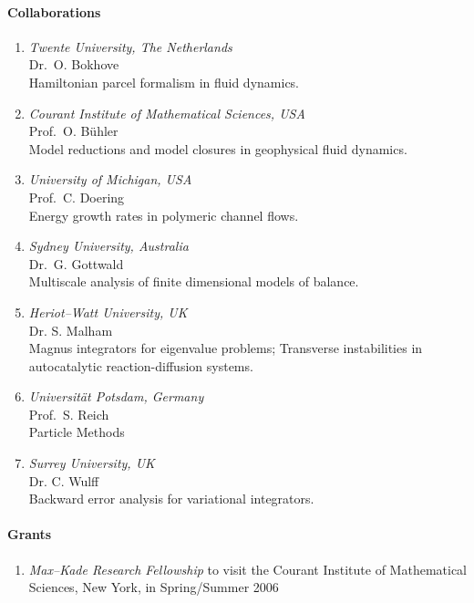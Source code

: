 \paragraph{Collaborations}
\begin{enumerate}
\item {\sl Twente University, The Netherlands} \\
Dr.\ O. Bokhove \\
Hamiltonian parcel formalism in fluid dynamics.
\item {\sl Courant Institute of Mathematical Sciences, USA} \\
Prof.\ O. B\"uhler \\
Model reductions and model closures in geophysical fluid
dynamics.
\item {\sl University of Michigan, USA} \\
Prof.\ C. Doering \\
Energy growth rates in polymeric channel flows.
\item {\sl Sydney University, Australia} \\
Dr.\ G. Gottwald \\
Multiscale analysis of finite dimensional models of balance.
\item {\sl Heriot--Watt University, UK}
\\ Dr. S. Malham \\
Magnus integrators for eigenvalue problems; Transverse instabilities
in autocatalytic reaction-diffusion systems.
\item {\sl Universit\"at Potsdam, Germany} \\
Prof.\ S. Reich \\
Particle Methods
\item {\sl Surrey University, UK} \\
Dr. C. Wulff \\
Backward error analysis for variational integrators.

\end{enumerate}

\paragraph{Grants}
\begin{enumerate}
\item {\sl Max--Kade Research Fellowship} to visit the Courant Institute of
Mathematical Sciences, New York, in Spring/Summer 2006
\end{enumerate}

\nocite{GottwaldOliverTecu,GottwaldOliver}

